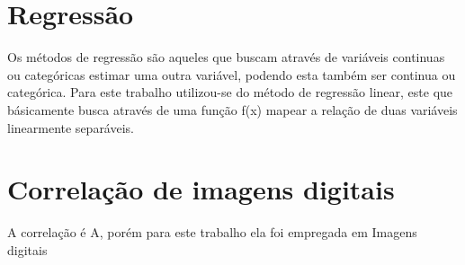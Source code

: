 



\section{Regressão} %

\par Os métodos de regressão são aqueles que buscam através de variáveis continuas ou categóricas estimar uma outra variável, podendo esta também ser continua ou categórica. Para este trabalho utilizou-se do método de regressão linear, este que básicamente busca através de uma função f(x) mapear a relação de duas variáveis linearmente separáveis.

\section{Correlação de imagens digitais}


\par A correlação é A, porém para este trabalho ela foi empregada em Imagens digitais



